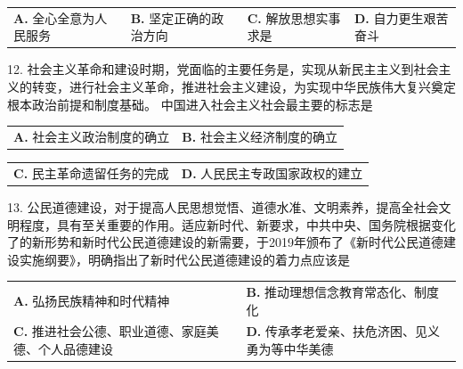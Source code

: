 \documentclass[UTF8,11pt]{ctexart}
\begin{document}
\begin{center}\begin{tabular}{>{\raggedright\arraybackslash}p{\dimexpr(\linewidth-8\tabcolsep)/4\relax}>{\raggedright\arraybackslash}p{\dimexpr(\linewidth-8\tabcolsep)/4\relax}>{\raggedright\arraybackslash}p{\dimexpr(\linewidth-8\tabcolsep)/4\relax}>{\raggedright\arraybackslash}p{\dimexpr(\linewidth-8\tabcolsep)/4\relax}}
\textbf{A.} 全心全意为人民服务 & \textbf{B.} 坚定正确的政治方向 & \textbf{C.} 解放思想实事求是 & \textbf{D.} 自力更生艰苦奋斗\\[.35em]\end{tabular}\end{center}

12. 社会主义革命和建设时期，党面临的主要任务是，实现从新民主主义到社会主义的转变，进行社会主义革命，推进社会主义建设，为实现中华民族伟大复兴奠定根本政治前提和制度基础。 中国进入社会主义社会最主要的标志是


\begin{center}\begin{tabular}{>{\raggedright\arraybackslash}p{\dimexpr(\linewidth-4\tabcolsep)/2\relax}>{\raggedright\arraybackslash}p{\dimexpr(\linewidth-4\tabcolsep)/2\relax}}
\textbf{A.} 社会主义政治制度的确立 & \textbf{B.} 社会主义经济制度的确立\\[.35em]\end{tabular}\end{center}

\begin{center}\begin{tabular}{>{\raggedright\arraybackslash}p{\dimexpr(\linewidth-4\tabcolsep)/2\relax}>{\raggedright\arraybackslash}p{\dimexpr(\linewidth-4\tabcolsep)/2\relax}}
\textbf{C.} 民主革命遗留任务的完成 & \textbf{D.} 人民民主专政国家政权的建立\\[.35em]\end{tabular}\end{center}

13. 公民道德建设，对于提高人民思想觉悟、道德水准、文明素养，提高全社会文明程度，具有至关重要的作用。适应新时代、新要求，中共中央、国务院根据变化了的新形势和新时代公民道德建设的新需要，于2019年颁布了《新时代公民道德建设实施纲要》，明确指出了新时代公民道德建设的着力点应该是


\begin{center}\begin{tabular}{>{\raggedright\arraybackslash}p{\dimexpr(\linewidth-4\tabcolsep)/2\relax}>{\raggedright\arraybackslash}p{\dimexpr(\linewidth-4\tabcolsep)/2\relax}}
\textbf{A.} 弘扬民族精神和时代精神 & \textbf{B.} 推动理想信念教育常态化、制度化\\[.35em]
\textbf{C.} 推进社会公德、职业道德、家庭美德、个人品德建设 & \textbf{D.} 传承孝老爱亲、扶危济困、见义勇为等中华美德\\[.35em]\end{tabular}\end{center}
\end{document}
